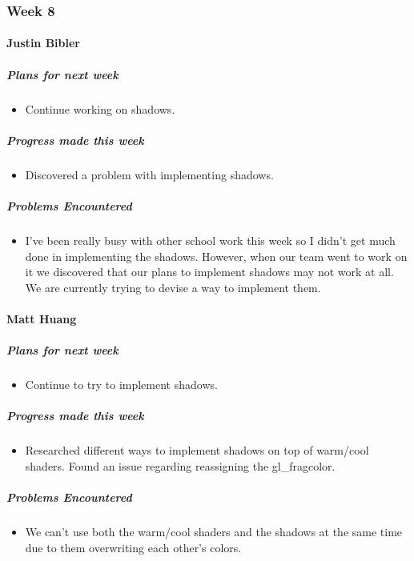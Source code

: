 {
\subsubsection{Week 8}
\paragraph{Justin Bibler}
\subparagraph{Plans for next week}
\begin{itemize}
  \item Continue working on shadows.
\end{itemize}

\subparagraph{Progress made this week}
\begin{itemize}
  \item Discovered a problem with implementing shadows.
\end{itemize}

\subparagraph{Problems Encountered}
\begin{itemize}
  \item I've been really busy with other school work this week so I didn't get much done in implementing the shadows. However, when our team went to work on it we discovered that our plans to implement shadows may not work at all. We are currently trying to devise a way to implement them.
\end{itemize}
\vspace{3mm}

\paragraph{Matt Huang}
\subparagraph{Plans for next week}
\begin{itemize}
  \item Continue to try to implement shadows.
\end{itemize}

\subparagraph{Progress made this week}
\begin{itemize}
  \item Researched different ways to implement shadows on top of warm/cool shaders. Found an issue regarding reassigning the gl_fragcolor.
\end{itemize}

\subparagraph{Problems Encountered}
\begin{itemize}
  \item We can't use both the warm/cool shaders and the shadows at the same time due to them overwriting each other's colors.
\end{itemize}
\vspace{3mm}

}
